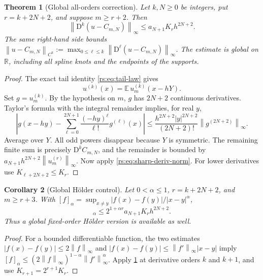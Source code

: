 \documentclass[11pt,a4paper,oneside,openany]{book}
\numberwithin{equation}{chapter}
\newtheorem{theorem}{Theorem}[chapter]
\newtheorem{corollary}[theorem]{Corollary}
\theoremstyle{definition}
\theoremstyle{remark}
\newcommand{\R}{\mathbb R}
\newcommand{\E}{\mathbb E}
\newcommand{\norm}[1]{\left\lVert #1\right\rVert}
\newcommand{\D}{\mathrm D}
\begin{document}
\begin{theorem}[Global all-orders correction]\label{rs:thm:global}
Let $k,N\geq0$ be integers, put $r=k+2N+2$, and suppose $m\geq r+2$.
Then
\begin{equation}
 \boxed{\ \norm{\D^k(u-C_{m,N})}_\infty
 \leq a_{N+1}K_rh^{2N+2}.\ }
 \label{rs:eq:global-bound}
\end{equation}
The same right-hand side bounds
$\norm{u-C_{m,N}}_{C^k}:=\max_{0\leq\ell\leq k}
\norm{\D^\ell(u-C_{m,N})}_\infty$.
The estimate is global on $\R$, including all spline knots and the
endpoints of the supports.
\end{theorem}
\begin{proof}
The exact tail identity \eqref{rs:eq:tail-law} gives
\begin{equation}
 u^{(k)}(x)=\E\,u_m^{(k)}(x-hY).
 \label{rs:eq:tail-differentiation}
\end{equation}
Set $g=u_m^{(k)}$. By the hypothesis on $m$, $g$ has $2N+2$
continuous derivatives. Taylor's formula with the integral remainder
implies, for real $y$,
\begin{equation}
 \left|g(x-hy)-\sum_{\ell=0}^{2N+1}
             \frac{(-hy)^\ell}{\ell!}g^{(\ell)}(x)\right|
 \leq \frac{h^{2N+2}|y|^{2N+2}}{(2N+2)!}
             \norm{g^{(2N+2)}}_\infty.
\end{equation}
Average over $Y$. All odd powers disappear because $Y$ is symmetric.
The remaining finite sum is precisely $\D^k C_{m,N}$, and the
remainder is bounded by
$a_{N+1}h^{2N+2}\norm{u_m^{(r)}}_\infty$.
Now apply \eqref{rs:eq:sharp-deriv-norm}. For lower derivatives use
$K_{\ell+2N+2}\leq K_r$.
\end{proof}

\begin{corollary}[Global H\"older control]\label{rs:cor:holder}
Let $0<\alpha\leq1$, $r=k+2N+2$, and $m\geq r+3$. With
$[f]_\alpha=\sup_{x\ne y}|f(x)-f(y)|/|x-y|^\alpha$,
\begin{equation}
 [\D^k(u-C_{m,N})]_\alpha
 \leq 2^{1+\alpha r}a_{N+1}K_rh^{2N+2}.
 \label{rs:eq:holder-bound}
\end{equation}
Thus a global fixed-order H\"older version is available as well.
\end{corollary}
\begin{proof}
For a bounded differentiable function, the two estimates
$|f(x)-f(y)|\leq2\norm f_\infty$ and
$|f(x)-f(y)|\leq\norm{f'}_\infty|x-y|$ imply
$[f]_\alpha\leq(2\norm f_\infty)^{1-\alpha}
\norm{f'}_\infty^\alpha$. Apply \cref{rs:thm:global} at derivative
orders $k$ and $k+1$, and use $K_{r+1}=2^{r+1}K_r$.
\end{proof}
\end{document}
